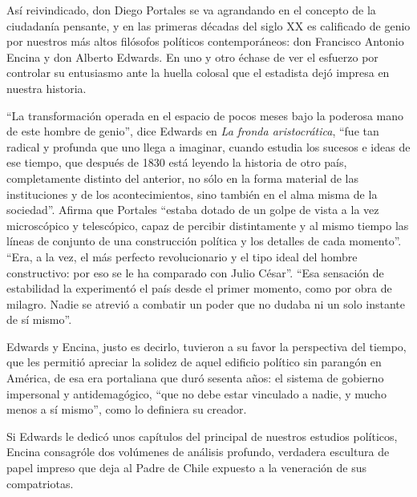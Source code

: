 \documentclass[10pt,twoside,openright]{memoir}
\begin{document}
Así reivindicado, don Diego Portales se va agrandando en el concepto de
la ciudadanía pensante, y en las primeras décadas del siglo XX es
calificado de genio por nuestros más altos filósofos políticos
contemporáneos: don Francisco Antonio Encina y don Alberto Edwards. En
uno y otro échase de ver el esfuerzo por controlar su entusiasmo ante la
huella colosal que el estadista dejó impresa en nuestra historia.

``La transformación operada en el espacio de pocos meses bajo la poderosa
mano de este hombre de genio'', dice Edwards en \emph{La fronda
aristocrática}, ``fue tan radical y profunda que uno llega a imaginar,
cuando estudia los sucesos e ideas de ese tiempo, que después de 1830
está leyendo la historia de otro país, completamente distinto del
anterior, no sólo en la forma material de las instituciones y de los
acontecimientos, sino también en el alma misma de la sociedad''. Afirma
que Portales ``estaba dotado de un golpe de vista a la vez microscópico y
telescópico, capaz de percibir distintamente y al mismo tiempo las
líneas de conjunto de una construcción política y los detalles de cada
momento''. ``Era, a la vez, el más perfecto revolucionario y el tipo ideal
del hombre constructivo: por eso se le ha comparado con Julio César''.
``Esa sensación de estabilidad la experimentó el país desde el primer
momento, como por obra de milagro. Nadie se atrevió a combatir un poder
que no dudaba ni un solo instante de sí mismo''.

Edwards y Encina, justo es decirlo, tuvieron a su favor la perspectiva
del tiempo, que les permitió apreciar la solidez de aquel edificio
político sin parangón en América, de esa era portaliana que duró sesenta
años: el sistema de gobierno impersonal y antidemagógico, ``que no debe
estar vinculado a nadie, y mucho menos a sí mismo'', como lo definiera su
creador.

Si Edwards le dedicó unos capítulos del principal de nuestros estudios
políticos, Encina consagróle dos volúmenes de análisis profundo,
verdadera escultura de papel impreso que deja al Padre de Chile expuesto
a la veneración de sus compatriotas.
\end{document}

